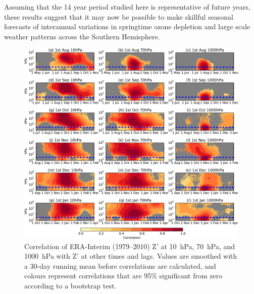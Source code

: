 Assuming that the 14 year period studied here is representative of future years,
these results suggest that it may now be possible to make skillful seasonal
forecasts of interannual variations in springtime ozone depletion and large
scale weather patterns across the Southern Hemisphere.


 \begin{figure}[p] \vspace*{-3cm} \centering
 \noindent\includegraphics[width=\textwidth]{figures/chapter-seasonal/lag_height_corr_obs.pdf}
 \caption[Lag-height correlation of $Z'$ at 10~hPa and 1000~hPa.]{Correlation of
   ERA-Interim (1979--2010) Z' at 10~hPa, 70~hPa, and 1000~hPa with Z' at other
   times and lags. Values are smoothed with a 30-day running mean before
   correlations are calculated, and colours represent correlations that are 95\%
   significant from zero according to a bootstrap test.}
 \label{fig:lag_height_corr_obs}
 \end{figure}

